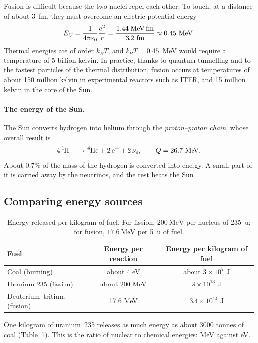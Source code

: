 \documentclass[11pt,a4paper]{article}
\begin{document}
Fusion is difficult because the two nuclei repel each other. To touch, at a distance of about 3~fm, they must overcome an electric potential energy
\[
E_C = \frac{1}{4\pi\varepsilon_0}\frac{e^2}{r} = \frac{1.44~\text{MeV\,fm}}{3.2~\text{fm}} \approx 0.45~\text{MeV}.
\]
Thermal energies are of order $k_B T$, and $k_B T = 0.45$~MeV would require a temperature of 5 billion kelvin. In practice, thanks to quantum tunnelling and to the fastest particles of the thermal distribution, fusion occurs at temperatures of about 150 million kelvin in experimental reactors such as ITER, and 15 million kelvin in the core of the Sun.

\paragraph{The energy of the Sun.} The Sun converts hydrogen into helium through the \emph{proton--proton chain}, whose overall result is
\[
\ce{4 ^{1}H -> ^{4}He + 2 e+ + 2 $\nu_e$}, \qquad Q = 26.7~\text{MeV}.
\]
About $0.7\%$ of the mass of the hydrogen is converted into energy. A small part of it is carried away by the neutrinos, and the rest heats the Sun.

\subsection{Comparing energy sources}

\begin{table}[h]
\centering
\begin{tabular}{lcc}
\toprule
Fuel & Energy per reaction & Energy per kilogram of fuel \\
\midrule
Coal (burning) & about 4 eV & about $3 \times 10^{7}$ J \\
Uranium 235 (fission) & about 200 MeV & $8 \times 10^{13}$ J \\
Deuterium--tritium (fusion) & 17.6 MeV & $3.4 \times 10^{14}$ J \\
\bottomrule
\end{tabular}
\caption{Energy released per kilogram of fuel. For fission, $200~\text{MeV}$ per nucleus of 235~u; for fusion, $17.6~\text{MeV}$ per 5~u of fuel.}
\label{tab:energy}
\end{table}

One kilogram of uranium~235 releases as much energy as about 3000 tonnes of coal (Table~\ref{tab:energy}). This is the ratio of nuclear to chemical energies: MeV against eV.

\end{document}
